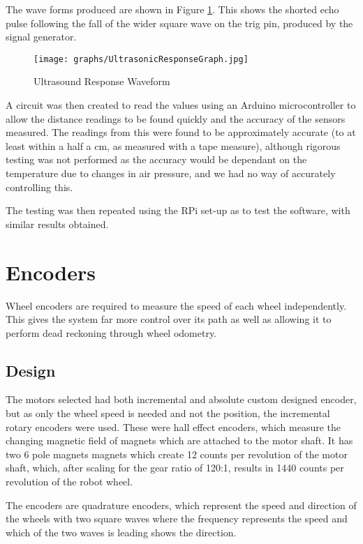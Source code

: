 The wave forms produced are shown in Figure \ref{UltrasoundWaveform}.
This shows the shorted echo pulse following the fall of the wider
square wave on the trig pin, produced by the signal generator.

\begin{figure}[!ht]
	\centering
	\texttt{[image: graphs/UltrasonicResponseGraph.jpg]}
	\caption{Ultrasound Response Waveform}\label{UltrasoundWaveform}

\end{figure}

A circuit was then created to read the values using an Arduino 
microcontroller to allow the distance readings to be found quickly
and the accuracy of the sensors measured. The readings from this were
found to be approximately accurate (to at least within a half a cm,
as measured with a tape measure), although rigorous testing was not 
performed as the accuracy would be dependant on the temperature due
to changes in air pressure, and we had no way of accurately controlling 
this.

The testing was then repeated using the RPi set-up as to test the 
software, with similar results obtained.

\section{Encoders}\label{elec/encoder}
Wheel encoders are required to measure the speed of each wheel 
independently. This gives the system far more control over its path
as well as allowing it to perform dead reckoning through wheel odometry.
\subsection{Design}\label{elec/encoder/design}
The motors selected had both incremental and absolute custom designed
encoder, but as only the wheel speed is needed and not the position,
the incremental rotary encoders were used. These were hall effect 
encoders, which measure the changing magnetic field of magnets which
are attached to the motor shaft. It has two 6 pole magnets magnets
which create 12 counts per revolution of the motor shaft, which, after
scaling for the gear ratio of 120:1, results in 1440 counts per
revolution of the robot wheel.

The encoders are quadrature encoders, which represent the speed and 
direction of the wheels with two square waves where the frequency 
represents the speed and which of the two waves is leading shows the 
direction.

